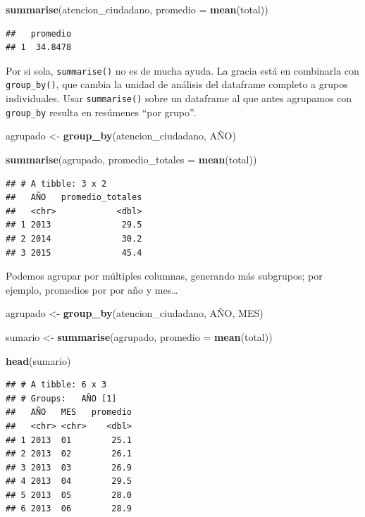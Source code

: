 \documentclass[spanish,]{book}
\newenvironment{Shaded}{\begin{snugshade}}{\end{snugshade}}
\newcommand{\DataTypeTok}[1]{\textcolor[rgb]{0.13,0.29,0.53}{#1}}
\newcommand{\KeywordTok}[1]{\textcolor[rgb]{0.13,0.29,0.53}{\textbf{#1}}}
\newcommand{\NormalTok}[1]{#1}
\newcommand{\StringTok}[1]{\textcolor[rgb]{0.31,0.60,0.02}{#1}}
\begin{document}
\begin{Shaded}
\begin{Highlighting}[]
\KeywordTok{summarise}\NormalTok{(atencion_ciudadano, }\DataTypeTok{promedio =} \KeywordTok{mean}\NormalTok{(total))}
\end{Highlighting}
\end{Shaded}

\begin{verbatim}
##   promedio
## 1  34.8478
\end{verbatim}

Por si sola, \texttt{summarise()} no es de mucha ayuda. La gracia está en combinarla con \texttt{group\_by()}, que cambia la unidad de análisis del dataframe completo a grupos individuales. Usar \texttt{summarise()} sobre un dataframe al que antes agrupamos con \texttt{group\_by} resulta en resúmenes ``por grupo''.

\begin{Shaded}
\begin{Highlighting}[]
\NormalTok{agrupado <-}\StringTok{ }\KeywordTok{group_by}\NormalTok{(atencion_ciudadano, AÑO)}

\KeywordTok{summarise}\NormalTok{(agrupado, }\DataTypeTok{promedio_totales =} \KeywordTok{mean}\NormalTok{(total))}
\end{Highlighting}
\end{Shaded}

\begin{verbatim}
## # A tibble: 3 x 2
##   AÑO   promedio_totales
##   <chr>            <dbl>
## 1 2013              29.5
## 2 2014              30.2
## 3 2015              45.4
\end{verbatim}

Podemos agrupar por múltiples columnas, generando más subgrupos; por ejemplo, promedios por por año y mes\ldots{}

\begin{Shaded}
\begin{Highlighting}[]
\NormalTok{agrupado <-}\StringTok{ }\KeywordTok{group_by}\NormalTok{(atencion_ciudadano, AÑO, MES)}

\NormalTok{sumario <-}\StringTok{ }\KeywordTok{summarise}\NormalTok{(agrupado, }\DataTypeTok{promedio =} \KeywordTok{mean}\NormalTok{(total))}

\KeywordTok{head}\NormalTok{(sumario)}
\end{Highlighting}
\end{Shaded}

\begin{verbatim}
## # A tibble: 6 x 3
## # Groups:   AÑO [1]
##   AÑO   MES   promedio
##   <chr> <chr>    <dbl>
## 1 2013  01        25.1
## 2 2013  02        26.1
## 3 2013  03        26.9
## 4 2013  04        29.5
## 5 2013  05        28.0
## 6 2013  06        28.9
\end{verbatim}
\end{document}
